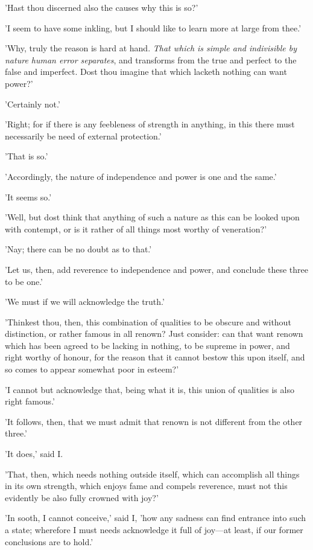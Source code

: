 'Hast thou discerned also the causes why this is so?'

'I seem to have some inkling, but I should like to learn more at large
from thee.'

'Why, truly the reason is hard at hand. \emph{That which is simple and
indivisible by nature human error separates}, and transforms from the
true and perfect to the false and imperfect. Dost thou imagine that
which lacketh nothing can want power?'

'Certainly not.'

'Right; for if there is any feebleness of strength in anything, in this
there must necessarily be need of external protection.'

'That is so.'

'Accordingly, the nature of independence and power is one and the same.'

'It seems so.'

'Well, but dost think that anything of such a nature as this can be
looked upon with contempt, or is it rather of all things most worthy of
veneration?'

'Nay; there can be no doubt as to that.'

'Let us, then, add reverence to independence and power, and conclude
these three to be one.'

'We must if we will acknowledge the truth.'

'Thinkest thou, then, this combination of qualities to be obscure and
without distinction, or rather famous in all renown? Just consider: can
that want renown which has been agreed to be lacking in nothing, to be
supreme in power, and right worthy of honour, for the reason that it
cannot bestow this upon itself, and so comes to appear somewhat poor in
esteem?'

'I cannot but acknowledge that, being what it is, this union of
qualities is also right famous.'

'It follows, then, that we must admit that renown is not different from
the other three.'

'It does,' said I.

'That, then, which needs nothing outside itself, which can accomplish
all things in its own strength, which enjoys fame and compels reverence,
must not this evidently be also fully crowned with joy?'

'In sooth, I cannot conceive,' said I, 'how any sadness can find
entrance into such a state; wherefore I must needs acknowledge it full
of joy—at least, if our former conclusions are to hold.'

